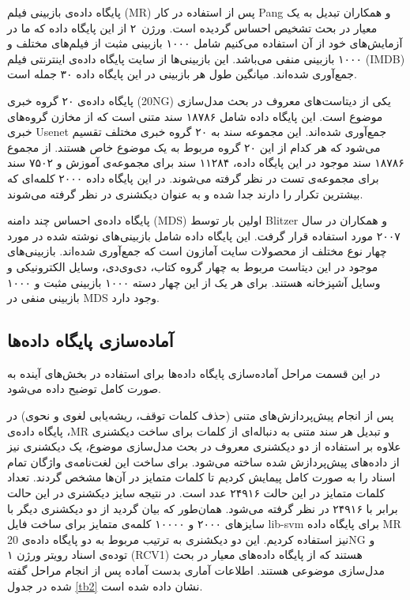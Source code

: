 \documentclass[12pt,a4paper]{article}
\begin{document}
پایگاه داد‌ه‌ی بازبینی فیلم (MR) پس از استفاده در کار Pang و همکاران تبدیل به یک معیار در بحث تشخیص احساس گردیده است. ورژن~۲ از این پایگاه داده که ما در آزمایش‌های خود از آن استفاده می‌‌کنیم شامل ۱۰۰۰ بازبینی مثبت از فیلم‌های مختلف و ۱۰۰۰ بازبینی منفی‌ می‌‌باشد. این بازبینی‌ها از سایت پایگاه داد‌ه‌ی اینترنتی فیلم (IMDB) جمع‌آوری شده‌اند. میانگین طول هر بازبینی در این پایگاه داده ۳۰ جمله است.

پایگاه داده‌ی ۲۰ گروه خبری (20NG) یکی‌ از دیتاست‌های معروف در بحث مدل‌سازی موضوع است. این پایگاه داده شامل ۱۸۷۸۶ سند متنی است که از مخازن گروه‌های خبری Usenet جمع‌آوری شده‌اند. این مجموعه سند به ۲۰ گروه خبری مختلف تقسیم می‌‌شود که هر کدام از این ۲۰ گروه مربوط به یک موضوع خاص هستند. از مجموع ۱۸۷۸۶ سند موجود در این پایگاه داده، ۱۱۲۸۴ سند برای مجموعه‌ی آموزش و ۷۵۰۲ سند برای مجموعه‌ی تست در نظر گرفته می‌‌شوند. در این پایگاه داده ۲۰۰۰ کلمه‌ای‌ که بیشترین تکرار را دارند جدا شده و به عنوان دیکشنری در نظر گرفته می‌‌شوند. 

پایگاه داده‌‌ی احساس چند دامنه (MDS) اولین بار توسط Blitzer و همکاران در سال ۲۰۰۷ مورد استفاده قرار گرفت. این پایگاه داده شامل بازبینی‌های نوشته شده در مورد چهار نوع مختلف از محصولات سایت آمازون است که جمع‌آوری شده‌اند.  بازبینی‌های موجود در این دیتاست مربوط به چهار گروه کتاب، دی‌وی‌دی، وسایل الکترونیکی‌ و وسایل آشپزخانه هستند. برای هر یک از این چهار دسته ۱۰۰۰ بازبینی مثبت و ۱۰۰۰ بازبینی منفی‌ در MDS وجود دارد.

\subsection{آماده‌سازی پایگاه داده‌ها}
\label{sec4-2}
در این قسمت مراحل آماده‌سازی پایگاه داده‌ها برای استفاده در بخش‌های آینده به صورت کامل توضیح داده می‌‌شود. 

پس از انجام پیش‌پردازش‌های متنی (حذف کلمات توقف، ریشه‌یابی لغوی و نحوی) در پایگاه داده‌ی ،MR و تبدیل هر سند متنی به دنباله‌ای از کلمات برای ساخت دیکشنری علاوه بر استفاده از دو دیکشنری معروف در بحث مدل‌سازی موضوع، یک دیکشنری نیز از داده‌های پیش‌پردازش شده ساخته می‌شود. برای ساخت این لغت‌نامه‌ی واژگان تمام اسناد را به صورت کامل پیمایش کردیم تا کلمات متمایز در آن‌ها مشخص گردند. تعداد کلمات متمایز در این حالت ۲۴۹۱۶ عدد است. در نتیجه سایز دیکشنری در این حالت برابر با ۲۴۹۱۶ در نظر گرفته می‌شود. همان‌طور که بیان گردید از دو دیکشنری دیگر با سایزهای ۲۰۰۰ و ۱۰۰۰۰ کلمه‌ی متمایز برای ساخت فایل
lib-svm
برای پایگاه داده MR‌ نیز استفاده کردیم. این دو دیکشنری به ترتیب مربوط به دو پایگاه داده‌ی 20NG
و توده‌ی اسناد رویتر ورژن ۱ (RCV1)
هستند که از پایگاه داده‌های معیار در بحث مدل‌سازی موضوعی هستند. اطلاعات آماری بدست آماده پس از انجام مراحل گفته شده در جدول
\ref{tb2}
نشان داده شده است.
\end{document}
